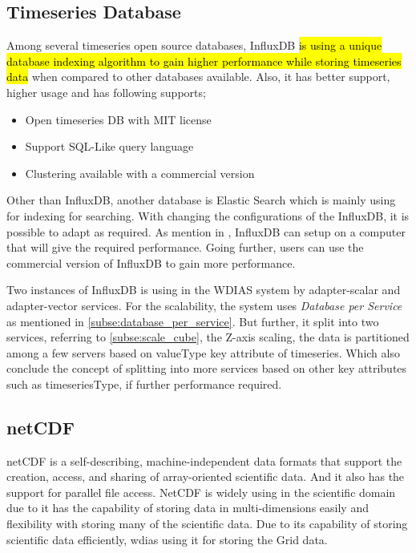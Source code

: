 \subsection{Timeseries Database}
\label{subse:influxdb}
Among several timeseries open source databases,  InfluxDB \cite{influxdbInfluxDBDocumentation} \hl{is using a unique database indexing algorithm to gain higher performance while storing timeseries data} when compared to other databases available. Also, it has better support, higher usage and has following supports;
\begin{itemize}
  \item Open timeseries DB with MIT license
  \item Support SQL-Like query language
  \item Clustering available with a commercial version
\end{itemize}
Other than  InfluxDB, another database is Elastic Search which is mainly using for indexing for searching.
With changing the configurations of the  InfluxDB, it is possible to adapt as required. As mention in \cite{influxdbInfluxDBDocumentation}, 
 InfluxDB can setup on a computer that will give the required performance. Going further, users can use the commercial version of  InfluxDB to gain more performance.

Two instances of  InfluxDB is using in the WDIAS system by adapter-scalar and adapter-vector services. For the scalability, the system uses \emph{Database per Service} as mentioned in \cref{subse:database_per_service}.
But further, it split into two services, referring to \cref{subse:scale_cube}, the Z-axis scaling, the data is partitioned among a few servers based on valueType key attribute of timeseries.
Which also conclude the concept of splitting into more services based on other key attributes such as timeseriesType, if further performance required.

\subsection{\acrfull{netCDF}}
\label{subse:netcdf}
\acrshort{netCDF} \cite{unidataUnidataNetCDF} is a self-describing, machine-independent data formats that support the creation, access, and sharing of array-oriented scientific data.
And it also has the support for parallel file access.
NetCDF is widely using in the scientific domain due to it has the capability of storing data in multi-dimensions easily and flexibility with storing many of the scientific data. Due to its capability of storing scientific data efficiently, \acrshort{wdias} using it for storing the Grid data.


